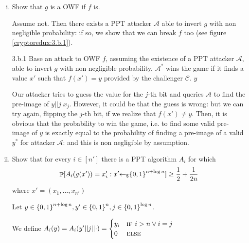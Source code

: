 \begin{enumerate}[(a)]
	\begin{enumerate}[(i)]
		\item Show that $g$ is a OWF if $f$ is.
		
		\begin{solution}
			Assume not. Then there exists a PPT attacker $\mathcal{A}$ able to invert $g$ with non negligible probability: if so, we show that we can break $f$ too (see figure \ref{cryptoredux:3.b.1}).
			\begin{cryptoredux}
				{3.b.1}
				{Base an attack to OWF $f$, assuming the existence of a PPT attacker $\mathcal{A}$, able to invert $g$ with non negligible probability. $\mathcal{A}^*$ wins the game if it finds a value $x'$ such that $f(x') = y$ provided by the challenger $\mathcal{C}$.}
				{}
				{}
				{}
				{$y$}{}
				\cseqdelay
				\cseqdelay
			\end{cryptoredux}
			Our attacker tries to guess the value for the $j$-th bit and queries $\mathcal{A}$ to find the pre-image of $y||j|x_j$. However, it could be that the guess is wrong: but we can try again, flipping the  $j$-th bit, if we realize that $f(x') \ne y$. Then, it is obvious that the probability to win the game, i.e. to find some valid pre-image of $y$ is exactly equal to the probability of finding a pre-image of a valid $y^*$ for attacker $\mathcal{A}$: and this is non negligible by assumption.
		\end{solution}
	
		\item Show that for every $i \in [n']$ there is a PPT algorithm $A_i$ for which
		\[ \mathop{\mathbb P}[A_i(g(x')) = x_i' : x' {\leftarrow_\$} {\{0, 1\}}^{n + \log{n}}] \ge \frac{1}{2} + \frac{1}{2n}\]
		where $x' = (x_1, \dots, x_{n'})$
		
		\begin{solution}
			Let $y \in {\{0, 1\}}^{n + \log{n}}, y' \in {\{0, 1\}}^n, j \in {\{0, 1\}}^{\log n}$.
			
			We define $A_i(y) = A_i(y'||j||\cdot) = \begin{cases}
			y_i &\textsc{if } i > n \vee i = j \\
			0 &\textsc{else}
			\end{cases}$


\end{solution}
\end{enumerate}
\end{enumerate}
